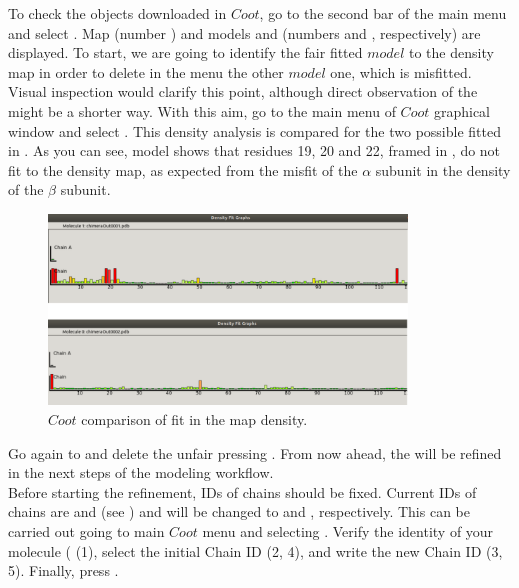 \begin{itemize}
  To check the objects downloaded in $Coot$, go to the second bar of the main menu and select . Map  (number ) and models  and  (numbers  and , respectively) are displayed. To start, we are going to identify the fair fitted $model$ to the density map in order to delete in the  menu the other $model$ one, which is misfitted. Visual inspection would clarify this point, although direct observation of the  might be a shorter way. With this aim, go to the main menu of $Coot$ graphical window and select . This density analysis is compared for the two possible fitted  in . As you can see, model  shows that residues 19, 20 and 22, framed in , do not fit to the density map, as expected from the misfit of the $\alpha$ subunit in the density of the $\beta$ subunit.
 
 \begin{figure}[H]
  \centering 
  \captionsetup{width=.7\linewidth} 
  \includegraphics[width=0.85\textwidth]{Images/Fig25.png}
  \caption{$Coot$ comparison of  fit in the map density.}
  \label{fig:coot_density_fit_analysis}
  \end{figure}
  
  Go again to  and delete the unfair   pressing . From now ahead, the   will be refined in the next steps of the modeling workflow.\\
  
  Before starting the refinement, IDs of chains should be fixed. Current IDs of chains are  and  (see ) and will be changed to  and , respectively. This can be carried out going to main $Coot$ menu and selecting . Verify the identity of your  molecule ( (1), select the initial Chain ID (2, 4), and write the new Chain ID (3, 5). Finally, press .
 

\end{itemize}

